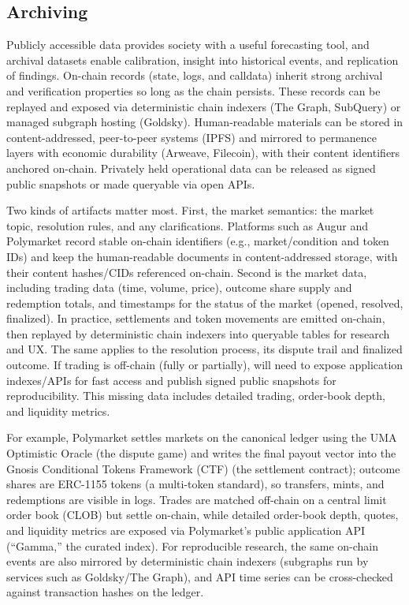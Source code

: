 \subsection{Archiving}\label{wf:archive}

Publicly accessible \depm data provides society with a useful forecasting tool, and archival datasets enable calibration, insight into historical events, and replication of findings. On-chain records (state, logs, and calldata) inherit strong archival and verification properties so long as the chain persists. These records can be replayed and exposed via deterministic chain indexers (\eg The Graph, SubQuery) or managed subgraph hosting (\eg Goldsky). Human-readable materials can be stored in content-addressed, peer-to-peer systems (\eg IPFS) and mirrored to permanence layers with economic durability (\eg Arweave, Filecoin), with their content identifiers anchored on-chain. Privately held operational data can be released as signed public snapshots or made queryable via open APIs.

Two kinds of artifacts matter most. First, the market semantics: the market topic, resolution rules, and any clarifications. Platforms such as Augur and Polymarket record stable on-chain identifiers (e.g., market/condition and token IDs) and keep the human-readable documents in content-addressed storage, with their content hashes/CIDs referenced on-chain. Second is the market data, including trading data (time, volume, price), outcome share supply and redemption totals, and timestamps for the status of the market (\eg opened, resolved, finalized). In practice, settlements and token movements are emitted on-chain, then replayed by deterministic chain indexers into queryable tables for research and UX. The same applies to the resolution process, its dispute trail and finalized outcome. If trading is off-chain (fully or partially), \depms will need to expose application indexes/APIs for fast access and publish signed public snapshots for reproducibility. This missing data includes detailed trading, order-book depth, and liquidity metrics.

For example, Polymarket settles markets on the canonical ledger using the UMA Optimistic Oracle (the dispute game) and writes the final payout vector into the Gnosis Conditional Tokens Framework (CTF) (the settlement contract); outcome shares are ERC-1155 tokens (a multi-token standard), so transfers, mints, and redemptions are visible in logs. Trades are matched off-chain on a central limit order book (CLOB) but settle on-chain, while detailed order-book depth, quotes, and liquidity metrics are exposed via Polymarket’s public application API (“Gamma,” the curated index). For reproducible research, the same on-chain events are also mirrored by deterministic chain indexers (subgraphs run by services such as Goldsky/The Graph), and API time series can be cross-checked against transaction hashes on the ledger.

